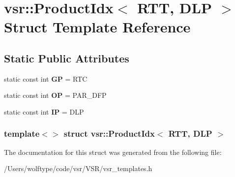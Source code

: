 \hypertarget{structvsr_1_1_product_idx_3_01_r_t_t_00_01_d_l_p_01_4}{\section{vsr\-:\-:Product\-Idx$<$ R\-T\-T, D\-L\-P $>$ Struct Template Reference}
\label{structvsr_1_1_product_idx_3_01_r_t_t_00_01_d_l_p_01_4}
}
\subsection*{Static Public Attributes}
\begin{DoxyCompactItemize}
\item 
\hypertarget{structvsr_1_1_product_idx_3_01_r_t_t_00_01_d_l_p_01_4_ace7e84452f17d600dfb0827eb38dbd91}{static const int {\bfseries G\-P} = R\-T\-C}\label{structvsr_1_1_product_idx_3_01_r_t_t_00_01_d_l_p_01_4_ace7e84452f17d600dfb0827eb38dbd91}

\item 
\hypertarget{structvsr_1_1_product_idx_3_01_r_t_t_00_01_d_l_p_01_4_a00a2884bc462ccf5a525a2e518ed8af8}{static const int {\bfseries O\-P} = P\-A\-R\-\_\-\-D\-F\-P}\label{structvsr_1_1_product_idx_3_01_r_t_t_00_01_d_l_p_01_4_a00a2884bc462ccf5a525a2e518ed8af8}

\item 
\hypertarget{structvsr_1_1_product_idx_3_01_r_t_t_00_01_d_l_p_01_4_aacb1159698abe21c1f8153abe6182fbe}{static const int {\bfseries I\-P} = D\-L\-P}\label{structvsr_1_1_product_idx_3_01_r_t_t_00_01_d_l_p_01_4_aacb1159698abe21c1f8153abe6182fbe}

\end{DoxyCompactItemize}
\subsubsection*{template$<$$>$ struct vsr\-::\-Product\-Idx$<$ R\-T\-T, D\-L\-P $>$}



The documentation for this struct was generated from the following file\-:\begin{DoxyCompactItemize}
\item 
/\-Users/wolftype/code/vsr/\-V\-S\-R/vsr\-\_\-templates.\-h\end{DoxyCompactItemize}
